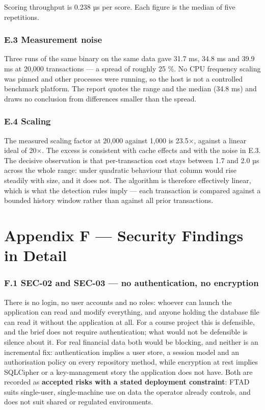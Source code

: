 \documentclass[
  12pt,
]{report}
\begin{document}
Scoring throughput is 0.238 µs per score. Each figure is the median of
five repetitions.

\subsection{E.3 Measurement noise}\label{e.3-measurement-noise}

Three runs of the same binary on the same data gave 31.7 ms, 34.8 ms and
39.9 ms at 20,000 transactions --- a spread of roughly 25 \%. No CPU
frequency scaling was pinned and other processes were running, so the
host is not a controlled benchmark platform. The report quotes the range
and the median (34.8 ms) and draws no conclusion from differences
smaller than the spread.

\subsection{E.4 Scaling}\label{e.4-scaling}

The measured scaling factor at 20,000 against 1,000 is 23.5×, against a
linear ideal of 20×. The excess is consistent with cache effects and
with the noise in E.3. The decisive observation is that per-transaction
cost stays between 1.7 and 2.0 µs across the whole range: under
quadratic behaviour that column would rise steadily with size, and it
does not. The algorithm is therefore effectively linear, which is what
the detection rules imply --- each transaction is compared against a
bounded history window rather than against all prior transactions.

\clearpage

\chapter{Appendix F --- Security Findings in
Detail}\label{appendix-f-security-findings-in-detail}

\subsection{F.1 SEC-02 and SEC-03 --- no authentication, no
encryption}\label{f.1-sec-02-and-sec-03-no-authentication-no-encryption}

There is no login, no user accounts and no roles: whoever can launch the
application can read and modify everything, and anyone holding the
database file can read it without the application at all. For a course
project this is defensible, and the brief does not require
authentication; what would not be defensible is silence about it. For
real financial data both would be blocking, and neither is an
incremental fix: authentication implies a user store, a session model
and an authorisation policy on every repository method, while encryption
at rest implies SQLCipher or a key-management story the application does
not have. Both are recorded as \textbf{accepted risks with a stated
deployment constraint}: FTAD suits single-user, single-machine use on
data the operator already controls, and does not suit shared or
regulated environments.
\end{document}
